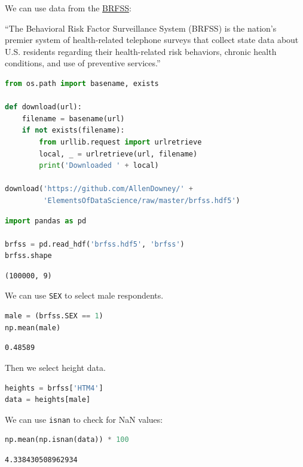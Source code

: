 We can use data from the
\href{https://www.cdc.gov/brfss/index.html}{BRFSS}:

``The Behavioral Risk Factor Surveillance System (BRFSS) is the nation's
premier system of health-related telephone surveys that collect state
data about U.S. residents regarding their health-related risk behaviors,
chronic health conditions, and use of preventive services.''

\begin{lstlisting}[language=Python]
from os.path import basename, exists

def download(url):
    filename = basename(url)
    if not exists(filename):
        from urllib.request import urlretrieve
        local, _ = urlretrieve(url, filename)
        print('Downloaded ' + local)
    
download('https://github.com/AllenDowney/' +
         'ElementsOfDataScience/raw/master/brfss.hdf5')
\end{lstlisting}

\begin{lstlisting}[language=Python]
import pandas as pd

brfss = pd.read_hdf('brfss.hdf5', 'brfss')
brfss.shape
\end{lstlisting}

\begin{lstlisting}[]
(100000, 9)
\end{lstlisting}

We can use \passthrough{\lstinline!SEX!} to select male respondents.

\begin{lstlisting}[language=Python]
male = (brfss.SEX == 1)
np.mean(male)
\end{lstlisting}

\begin{lstlisting}[]
0.48589
\end{lstlisting}

Then we select height data.

\begin{lstlisting}[language=Python]
heights = brfss['HTM4']
data = heights[male]
\end{lstlisting}

We can use \passthrough{\lstinline!isnan!} to check for NaN values:

\begin{lstlisting}[language=Python]
np.mean(np.isnan(data)) * 100
\end{lstlisting}

\begin{lstlisting}[]
4.338430508962934
\end{lstlisting}

